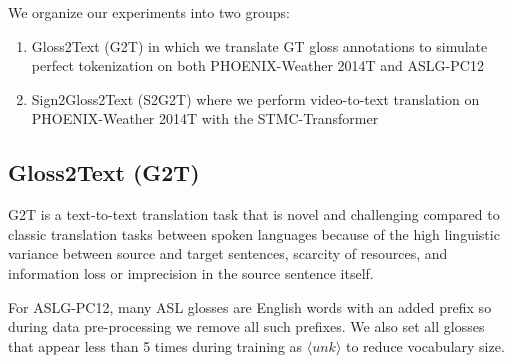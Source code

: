 \documentclass[11pt]{article}
\begin{document}
We organize our experiments into two groups:
\begin{enumerate}
    \item Gloss2Text (G2T) in which we translate GT gloss annotations to simulate perfect tokenization on both PHOENIX-Weather 2014T and ASLG-PC12 
    \item Sign2Gloss2Text (S2G2T) where we perform video-to-text translation on PHOENIX-Weather 2014T with the STMC-Transformer

\end{enumerate}





\subsection{Gloss2Text (G2T)}
\label{sec:layers}
 G2T is a text-to-text translation task that is novel and challenging compared to classic translation tasks between spoken languages because of the high linguistic variance between source and target sentences, scarcity of resources, and information loss or imprecision in the source sentence itself.
 
For ASLG-PC12, many ASL glosses are English words with an added prefix so during data pre-processing we remove all such prefixes. We also set all glosses that appear less than 5 times during training as $\langle unk \rangle$ to reduce vocabulary size. 

\begin{center}
\label{table:asl}
\end{center}
\end{document}
